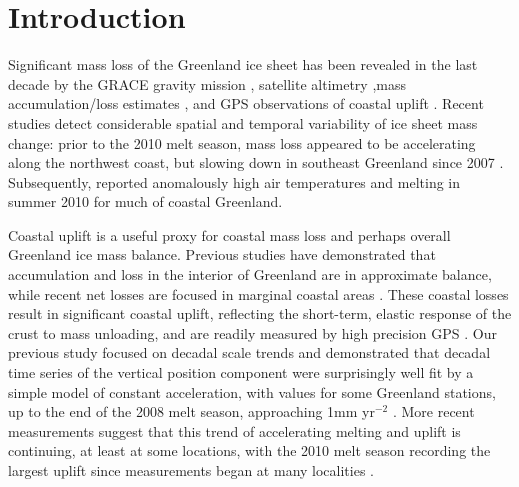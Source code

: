 \section{Introduction}
Significant mass loss of the Greenland ice sheet
has been revealed in the last decade by the GRACE
gravity mission \cite[]{velicogna2006acceleration,velicogna2009increasing,chen2006satellite,luthcke2006recent,van2009partitioning,jacob2012recent}, satellite altimetry \cite[]{krabill2004greenland,zwally2005mass,thomas2006progressive},mass accumulation/loss estimates \cite[]{hanna2005runoff,rignot2006changes,rignot2008mass}, and GPS observations of coastal uplift \cite[]{jiang2010accelerating,khan2010spread,bevis2012bedrock}. Recent studies detect considerable spatial
and temporal variability of ice sheet mass change: prior to the 2010 melt season, mass loss appeared to be accelerating along the northwest coast, but slowing down in southeast Greenland since 2007 \cite[]{khan2010spread,murray2010ocean,chen2011interannual}. Subsequently, \cite{box2010greenland} reported
anomalously high air temperatures and melting in summer 2010 for much of coastal Greenland. 

Coastal uplift is a useful proxy for coastal mass loss and perhaps overall Greenland ice mass balance. Previous studies have demonstrated that accumulation and loss in the interior of Greenland are in approximate balance, while recent net losses are focused in marginal coastal areas \cite[e.g.,][]{zwally2005mass,thomas2006progressive,luthcke2006recent,rignot2006changes,wouters2008grace}. These coastal losses result in significant coastal uplift, reflecting the short-term, elastic response of the crust to mass unloading, and are readily measured by high precision GPS \cite[]{jiang2010accelerating,khan2010spread,bevis2012bedrock}. Our previous study focused on decadal scale trends
and demonstrated that decadal time series of the vertical position component were surprisingly well fit by a simple model of constant acceleration, with values for some Greenland stations, up to the end of the 2008 melt season, approaching 1mm yr$^{-2}$ \cite[]{jiang2010accelerating}. More recent measurements suggest that this trend of accelerating melting and uplift is continuing, at least at some locations, with the 2010 melt season recording the largest uplift since measurements began at many localities \cite[]{bevis2012bedrock}.

